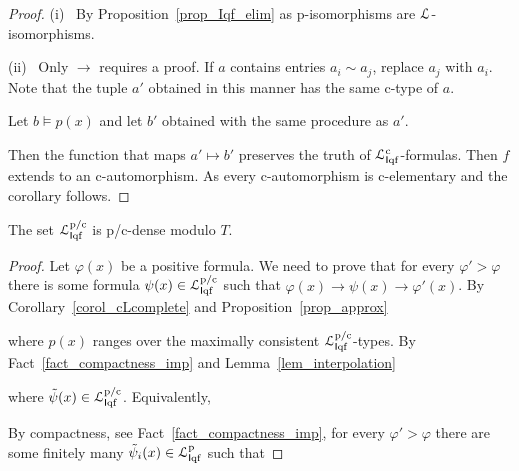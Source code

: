 \documentclass{amsproc}
\begin{document}
{\begin{proof}
  (i) \ 
  By Proposition~\ref{prop_Iqf_elim} as p-isomorphisms are ${\EuScript L}$-isomorphisms.


  (ii) \ 
  Only $\rightarrow$ requires a proof.
  If $a$ contains entries $a_i\sim a_j$, replace $a_j$ with $a_i$.
  Note that the tuple $a'$ obtained in this manner has the same c-type of $a$.
 
  Let $b\models p(x)$ and let $b'$ obtained with the same procedure as $a'$.
  
  Then the function that maps $a'\mapsto b'$ preserves the truth of ${\EuScript L}^{\rm c}_{{\sf I}{\rm qf}}$-formulas.
  Then $f$ extends to an c-automorphism.
  As every c-automorphism is c-elementary and the corollary follows.
\end{proof}

\begin{proposition}\label{prop_cLHapprox1}
  The set ${\EuScript L}^{\rm p/c}_{{\sf I}{\rm qf}}$ is p/c-dense modulo $T$.
\end{proposition}

\begin{proof}
  Let $\varphi(x)$ be a positive formula.
  We need to prove that for every $\varphi'>\varphi$ there is some formula $\psi(x)\in{\EuScript L}^{\rm p/c}_{{\sf I}{\rm qf}}$ such that $\varphi(x)\rightarrow\psi(x)\rightarrow\varphi'(x)$.
  By Corollary~\ref{corol_cLcomplete} and Proposition~\ref{prop_approx}


  where $p(x)$ ranges over the maximally consistent ${\EuScript L}^{\rm p/c}_{{\sf I}{\rm qf}}$-types.
  By Fact~\ref{fact_compactness_imp} and Lemma~\ref{lem_interpolation}


  where $\tilde{\psi}(x)\in{\EuScript L}^{\rm p/c}_{{\sf I}{\rm qf}}$.
  Equivalently,


  By compactness, see Fact~\ref{fact_compactness_imp}, for every $\varphi'>\varphi$ there are some finitely many $\tilde{\psi}_i(x)\in{\EuScript L}^{\rm p}_{{\sf I}{\rm qf}}$ such that

  \ceq{\hfill\varphi'(x)}{\leftarrow}{\bigwedge_{i=1,\dots,n}\tilde{\psi}_i(x)\ \ \leftarrow\ \ \varphi(x)}


\end{proof}}
\end{document}
